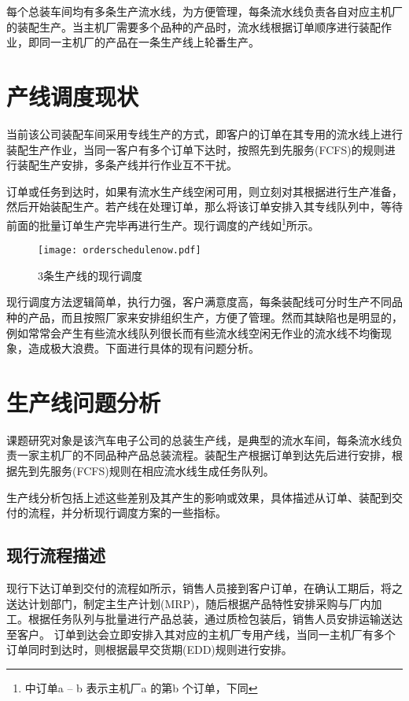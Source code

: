 每个总装车间均有多条生产流水线，为方便管理，每条流水线负责各自对应主机厂的装配生产。当主机厂需要多个品种的产品时，流水线根据订单顺序进行装配作业，即同一主机厂的产品在一条生产线上轮番生产。


\section{产线调度现状}
当前该公司装配车间采用专线生产的方式，即客户的订单在其专用的流水线上进行装配生产作业，当同一客户有多个订单下达时，按照先到先服务(FCFS)的规则进行装配生产安排，多条产线并行作业互不干扰。

订单或任务到达时，如果有流水生产线空闲可用，则立刻对其根据进行生产准备，然后开始装配生产。若产线在处理订单，那么将该订单安排入其专线队列中，等待前面的批量订单生产完毕再进行生产。现行调度的产线如\footnote{中订单a -- b 表示主机厂a 的第b 个订单，下同}所示。
\begin{figure}[h]
\caption{$3$条生产线的现行调度\label{fig:3nowschedule}}\texttt{[image: orderschedulenow.pdf]}
\end{figure}

现行调度方法逻辑简单，执行力强，客户满意度高，每条装配线可分时生产不同品种的产品，而且按照厂家来安排组织生产，方便了管理。然而其缺陷也是明显的，例如常常会产生有些流水线队列很长而有些流水线空闲无作业的流水线不均衡现象，造成极大浪费。下面进行具体的现有问题分析。

\section{生产线问题分析}
课题研究对象是该汽车电子公司的总装生产线，是典型的流水车间，每条流水线负责一家主机厂的不同品种产品总装流程。装配生产根据订单到达先后进行安排，根据先到先服务(FCFS)规则在相应流水线生成任务队列。

生产线分析包括上述这些差别及其产生的影响或效果，具体描述从订单、装配到交付的流程，并分析现行调度方案的一些指标。

\subsection{现行流程描述}
现行下达订单到交付的流程如所示，销售人员接到客户订单，在确认工期后，将之送达计划部门，制定主生产计划(MRP)，随后根据产品特性安排采购与厂内加工。根据任务队列与批量进行产品总装，通过质检包装后，销售人员安排运输送达至客户。
订单到达会立即安排入其对应的主机厂专用产线，当同一主机厂有多个订单同时到达时，则根据最早交货期(EDD)规则进行安排。

